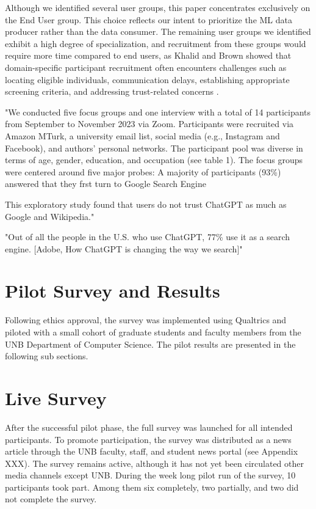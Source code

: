 \documentclass[manuscript,review,anonymous]{acmart}
\begin{document}

	Although we identified several user groups, this paper concentrates exclusively on the End User group. This choice reflects our intent to prioritize the ML data producer rather than the data consumer. The remaining user groups we identified exhibit a high degree of specialization, and recruitment from these groups would require more time compared to end users, as Khalid and Brown showed that domain-specific participant recruitment often encounters challenges such as locating eligible individuals, communication delays, establishing appropriate screening criteria, and addressing trust-related concerns \cite{10714565}.

	"We conducted five focus groups and one interview with a total of 14 participants from September to November 2023 via Zoom. \cite{10.1145/3613905.3650862} Participants were recruited via Amazon MTurk, a university email list, social media (e.g., Instagram and Facebook), and authors’ personal networks. The participant pool was diverse in terms of age, gender, education, and occupation (see table 1).
	The focus groups were centered around five major probes: A majority of participants (93\%) answered that they frst turn to Google Search Engine

	This exploratory study found that users do not trust ChatGPT as much as Google and Wikipedia."

	"Out of all the people in the U.S. who use ChatGPT,	77\% use it as a search engine. [Adobe, How ChatGPT is changing the	way we search]"

\section{Pilot Survey and Results}\label{pilotsurvey}

	Following ethics approval, the survey was implemented using Qualtrics and piloted with a small cohort of graduate students and faculty members from the UNB Department of Computer Science. The pilot results are presented in the following sub sections.

\section{Live Survey}

	After the successful pilot phase, the full survey was launched for all intended participants. To promote participation, the survey was distributed as a news article through the UNB faculty, staff, and student news portal (see Appendix XXX). The survey remains active, although it has not yet been circulated other media channels except UNB. During the week long pilot run of the survey, 10 participants took part. Among them six completely, two partially, and two did not complete the survey.
\end{document}
